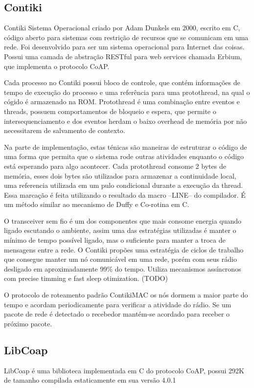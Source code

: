 \subsection{Contiki}
Contiki Sistema Operacional criado por Adam Dunkels em 2000, escrito em C, c\'odigo aberto para sistemas com restri\c{c}\~ao de recursos que se comunicam em uma rede. Foi desenvolvido para ser um sistema operacional para Internet das coisas. Possui uma camada de abstra\c{c}\~ao RESTful para web services chamada Erbium, que implementa o protocolo CoAP.

Cada processo no Contiki possui bloco de controle, que cont\'em informa\c{c}\~oes de tempo de execu\c{c}\~ao do processo e uma refer\^encia para uma protothread, na qual o c\'ogido \'e armazenado na ROM. Protothread \'e uma combina\c{c}\~ao entre eventos e threads, possuem comportamentos de bloqueio e espera, que permite o intersequenciamento e dos eventos herdam o baixo overhead de mem\'oria por n\~ao necessitarem de salvamento de contexto.

Na parte de implementa\c{c}\~ao, estas t\'enicas s\~ao maneiras de estruturar o c\'odigo de uma forma que permita que o sistema rode outras atividades enquanto o c\'odigo est\'a esperando para algo acontecer. Cada protothread consome 2 bytes de mem\'oria, esses dois bytes s\~ao utilizados para armazenar a continuidade local, uma referencia utilizada em um pulo condicional durante a execu\c{c}\~ao da thread. Essa marca\c{c}\~ao \'e feita utilizando o resultado da macro --LINE-- do compilador. \'E um m\'etodo similar ao mecanismo de Duffy e Co-rotina em C. \cite{duffy}

O transceiver sem fio \'e um dos componentes que mais consome energia quando ligado escutando o ambiente, assim uma das estrat\'egias utilizadas \'e manter o m\'inimo de tempo poss\'ivel ligado, mas o suficiente para manter a troca de mensagens entre a rede. O Contiki prop\~oes uma estrat\'egia de ciclos de trabalho que consegue manter um n\'o comunic\'avel em uma rede, por\'em com seus r\'adio desligado em aproximadamente 99\% do tempo. Utiliza mecanismos ass\'incronos com precise timming e fast sleep otimization. (TODO)

O protocolo de roteamento padr\~ao ContikiMAC os n\'os dormem a maior parte do tempo e acordam periodicamente para verificar a atividade do r\'adio. Se um pacote de rede \'e detectado o recebedor mant\'em-se acordado para receber o pr\'oximo pacote.

\subsection{LibCoap}
LibCoap \'e uma biblioteca implementada em C do protocolo CoAP, possui 292K de tamanho compilada estaticamente em sua vers\~ao 4.0.1


